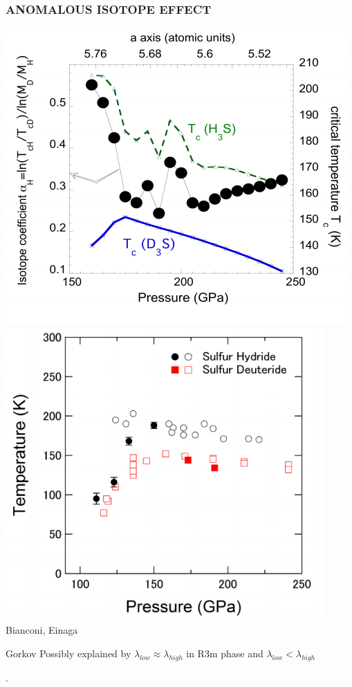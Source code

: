 \documentclass[amssymb,amsmath]{beamer}
\begin{document}
\begin{frame}
\frametitle{ANOMALOUS ISOTOPE EFFECT}
\includegraphics[scale=0.29]{./figures/anomalous_isotope_bianconi.png}\quad
\includegraphics[scale=0.3]{./figures/PT_einaga.png} \\
Bianconi, Einaga \\[0.3cm]
\begin{block}{Gorkov}
Possibly explained by $\lambda_{low}\approx\lambda_{high}$ in R3m phase and $\lambda_{low}<\lambda_{high}$
\end{block}.
\end{frame}
\end{document}
